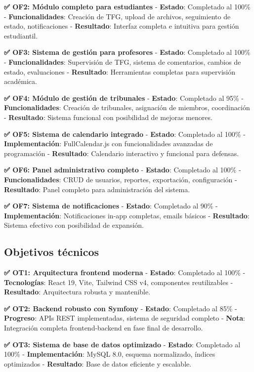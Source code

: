 \documentclass[12pt,a4paper,oneside]{report}
\begin{document}
\textbf{✅ OF2: Módulo completo para estudiantes} - \textbf{Estado}:
Completado al 100\% - \textbf{Funcionalidades}: Creación de TFG, upload
de archivos, seguimiento de estado, notificaciones - \textbf{Resultado}:
Interfaz completa e intuitiva para gestión estudiantil.

\textbf{✅ OF3: Sistema de gestión para profesores} - \textbf{Estado}:
Completado al 100\% - \textbf{Funcionalidades}: Supervisión de TFG,
sistema de comentarios, cambios de estado, evaluaciones -
\textbf{Resultado}: Herramientas completas para supervisión académica.

\textbf{✅ OF4: Módulo de gestión de tribunales} - \textbf{Estado}:
Completado al 95\% - \textbf{Funcionalidades}: Creación de tribunales,
asignación de miembros, coordinación - \textbf{Resultado}: Sistema
funcional con posibilidad de mejoras menores.

\textbf{✅ OF5: Sistema de calendario integrado} - \textbf{Estado}:
Completado al 100\% - \textbf{Implementación}: FullCalendar.js con
funcionalidades avanzadas de programación - \textbf{Resultado}:
Calendario interactivo y funcional para defensas.

\textbf{✅ OF6: Panel administrativo completo} - \textbf{Estado}:
Completado al 100\% - \textbf{Funcionalidades}: CRUD de usuarios,
reportes, exportación, configuración - \textbf{Resultado}: Panel
completo para administración del sistema.

\textbf{✅ OF7: Sistema de notificaciones} - \textbf{Estado}: Completado
al 90\% - \textbf{Implementación}: Notificaciones in-app completas,
emails básicos - \textbf{Resultado}: Sistema efectivo con posibilidad de
expansión.

\subsection{Objetivos técnicos}\label{objetivos-tuxe9cnicos}

\textbf{✅ OT1: Arquitectura frontend moderna} - \textbf{Estado}:
Completado al 100\% - \textbf{Tecnologías}: React 19, Vite, Tailwind CSS
v4, componentes reutilizables - \textbf{Resultado}: Arquitectura robusta
y mantenible.

\textbf{✅ OT2: Backend robusto con Symfony} - \textbf{Estado}:
Completado al 85\% - \textbf{Progreso}: APIs REST implementadas, sistema
de seguridad completo - \textbf{Nota}: Integración completa
frontend-backend en fase final de desarrollo.

\textbf{✅ OT3: Sistema de base de datos optimizado} - \textbf{Estado}:
Completado al 100\% - \textbf{Implementación}: MySQL 8.0, esquema
normalizado, índices optimizados - \textbf{Resultado}: Base de datos
eficiente y escalable.
\end{document}
